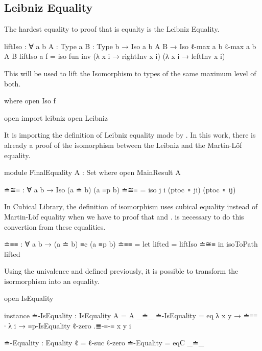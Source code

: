 \documentclass{article}
\begin{document}
\subsection{Leibniz Equality}

The hardest equality to proof that is equalty is the Leibniz Equality.

\begin{code}
liftIso : ∀ {a b} {A : Type a} {B : Type b}
  → Iso {a} {b} A B → Iso {ℓ-max a b} {ℓ-max a b} A B
liftIso {a} f = iso fun inv
  (λ x i → rightInv x i) (λ x i → leftInv x i)
\end{code}

This  will be used to lift the Isomorphism to types of the same maximum level of both.

\begin{code}
  where open Iso f

open import leibniz
open Leibniz
\end{code}

It is importing the definition of Leibniz equality made by \cite{abel2020leibniz}.
In this work, there is already a proof of the isomorphism between the Leibniz and the Martin-Löf equality.

\begin{code}
module FinalEquality {A : Set} where
  open MainResult A

  ≐≅≡ : ∀ {a b} → Iso (a ≐ b) (a ≡p b)
  ≐≅≡ = iso j i (ptoc ∘ ji) (ptoc ∘ ij)
\end{code}

In Cubical Library, the definition of isomorphism uses cubical equality instead of Martin-Löf equality
when we have to proof that  and .
 is necessary to do this convertion from these equalities.

\begin{code}
  ≐≡≡ : ∀ {a b} → (a ≐ b) ≡c (a ≡p b)
  ≐≡≡ = let lifted = liftIso ≐≅≡  in isoToPath lifted
\end{code}

Using the univalence and  defined previously, it is possible to transform the isormorphism
into an equality.

\begin{code}
  open IsEquality

  instance
    ≐-IsEquality : IsEquality {A = A} _≐_
    ≐-IsEquality = eq λ {x} {y} → ≐≡≡ ∙
      λ i → ≡p-IsEquality {ℓ-zero} .≣-≡-≡ {x} {y} i

  ≐-Equality : Equality {ℓ = ℓ-suc ℓ-zero}
  ≐-Equality = eqC _≐_
\end{code}
\end{document}
